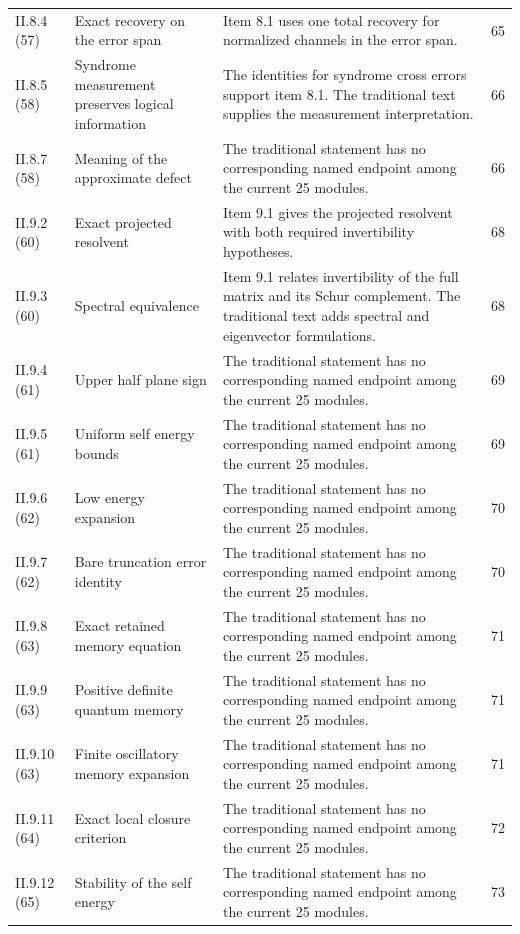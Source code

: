 {\begin{longtable}{@{}p{.13\linewidth}p{.31\linewidth}p{.42\linewidth}r@{}}
II.8.4 (57) & Exact recovery on the error span & Item 8.1 uses one total recovery for normalized channels in the error span. & 65\\
II.8.5 (58) & Syndrome measurement preserves logical information & The identities for syndrome cross errors support item 8.1. The traditional text supplies the measurement interpretation. & 66\\
II.8.7 (58) & Meaning of the approximate defect & The traditional statement has no corresponding named endpoint among the current 25 modules. & 66\\
II.9.2 (60) & Exact projected resolvent & Item 9.1 gives the projected resolvent with both required invertibility hypotheses. & 68\\
II.9.3 (60) & Spectral equivalence & Item 9.1 relates invertibility of the full matrix and its Schur complement. The traditional text adds spectral and eigenvector formulations. & 68\\
II.9.4 (61) & Upper half plane sign & The traditional statement has no corresponding named endpoint among the current 25 modules. & 69\\
II.9.5 (61) & Uniform self energy bounds & The traditional statement has no corresponding named endpoint among the current 25 modules. & 69\\
II.9.6 (62) & Low energy expansion & The traditional statement has no corresponding named endpoint among the current 25 modules. & 70\\
II.9.7 (62) & Bare truncation error identity & The traditional statement has no corresponding named endpoint among the current 25 modules. & 70\\
II.9.8 (63) & Exact retained memory equation & The traditional statement has no corresponding named endpoint among the current 25 modules. & 71\\
II.9.9 (63) & Positive definite quantum memory & The traditional statement has no corresponding named endpoint among the current 25 modules. & 71\\
II.9.10 (63) & Finite oscillatory memory expansion & The traditional statement has no corresponding named endpoint among the current 25 modules. & 71\\
II.9.11 (64) & Exact local closure criterion & The traditional statement has no corresponding named endpoint among the current 25 modules. & 72\\
II.9.12 (65) & Stability of the self energy & The traditional statement has no corresponding named endpoint among the current 25 modules. & 73\\

\end{longtable}}

